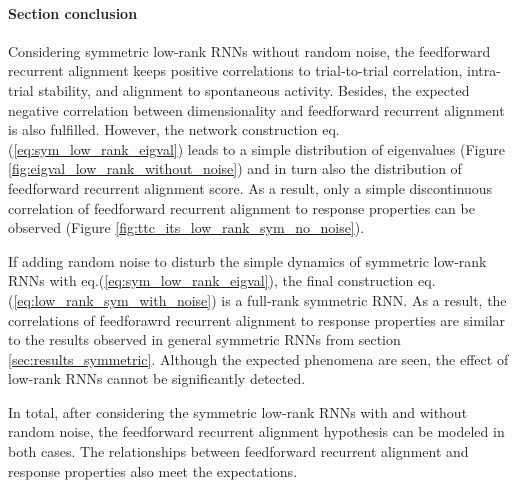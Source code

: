\documentclass[11pt]{article}
\begin{document}
	
	\newpage
	\paragraph{Section conclusion}
	
	Considering symmetric low-rank RNNs without random noise, the feedforward recurrent alignment keeps positive correlations to trial-to-trial correlation, intra-trial stability, and alignment to spontaneous activity. Besides, the expected negative correlation between dimensionality and feedforward recurrent alignment is also fulfilled. However, the network construction eq.(\ref{eq:sym_low_rank_eigval}) leads to a simple distribution of eigenvalues (Figure \ref{fig:eigval_low_rank_without_noise}) and in turn also the distribution of feedforward recurrent alignment score. As a result, only a simple discontinuous correlation of feedforward recurrent alignment to response properties can be observed (Figure \ref{fig:ttc_its_low_rank_sym_no_noise}). 
	
	If adding random noise to disturb the simple dynamics of symmetric low-rank RNNs with eq.(\ref{eq:sym_low_rank_eigval}), the final construction eq.(\ref{eq:low_rank_sym_with_noise}) is a full-rank symmetric RNN. As a result, the correlations of feedforawrd recurrent alignment to response properties are similar to the results observed in general symmetric RNNs from section \ref{sec:results_symmetric}. Although the expected phenomena are seen, the effect of low-rank RNNs cannot be significantly detected. 
	
	In total, after considering the symmetric low-rank RNNs with and without random noise, the feedforward recurrent alignment hypothesis can be modeled in both cases. The relationships between feedforward recurrent alignment and response properties also meet the expectations. %
	
\end{document}
